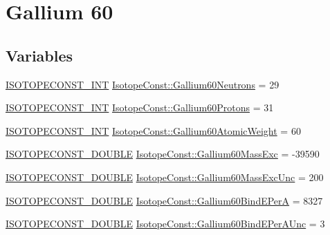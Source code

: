 \hypertarget{group___isotope_const-_gallium-_ga60}{}\section{Gallium 60}
\label{group___isotope_const-_gallium-_ga60}
\subsection*{Variables}
\begin{DoxyCompactItemize}
\item 
\mbox{\hyperlink{group___isotope_const-_macros_ga5f18360b3e99483a35c32d789e62621c}{I\+S\+O\+T\+O\+P\+E\+C\+O\+N\+S\+T\+\_\+\+I\+NT}} \mbox{\hyperlink{group___isotope_const-_gallium-_ga60_gab697fd12d36e5c2ad66c51135e3b0254}{Isotope\+Const\+::\+Gallium60\+Neutrons}} = 29
\item 
\mbox{\hyperlink{group___isotope_const-_macros_ga5f18360b3e99483a35c32d789e62621c}{I\+S\+O\+T\+O\+P\+E\+C\+O\+N\+S\+T\+\_\+\+I\+NT}} \mbox{\hyperlink{group___isotope_const-_gallium-_ga60_gab2f1a6f2be70737ded3924f132def1ab}{Isotope\+Const\+::\+Gallium60\+Protons}} = 31
\item 
\mbox{\hyperlink{group___isotope_const-_macros_ga5f18360b3e99483a35c32d789e62621c}{I\+S\+O\+T\+O\+P\+E\+C\+O\+N\+S\+T\+\_\+\+I\+NT}} \mbox{\hyperlink{group___isotope_const-_gallium-_ga60_ga33897cc7594541c17576898c5fff0ec6}{Isotope\+Const\+::\+Gallium60\+Atomic\+Weight}} = 60
\item 
\mbox{\hyperlink{group___isotope_const-_macros_ga8f45a7272ce02c0b4c65c44636ed719a}{I\+S\+O\+T\+O\+P\+E\+C\+O\+N\+S\+T\+\_\+\+D\+O\+U\+B\+LE}} \mbox{\hyperlink{group___isotope_const-_gallium-_ga60_ga65397c230d168b7f569a55579b13918f}{Isotope\+Const\+::\+Gallium60\+Mass\+Exc}} = -\/39590
\item 
\mbox{\hyperlink{group___isotope_const-_macros_ga8f45a7272ce02c0b4c65c44636ed719a}{I\+S\+O\+T\+O\+P\+E\+C\+O\+N\+S\+T\+\_\+\+D\+O\+U\+B\+LE}} \mbox{\hyperlink{group___isotope_const-_gallium-_ga60_gac091d40a8a1d6e8052d14226fb903c2e}{Isotope\+Const\+::\+Gallium60\+Mass\+Exc\+Unc}} = 200
\item 
\mbox{\hyperlink{group___isotope_const-_macros_ga8f45a7272ce02c0b4c65c44636ed719a}{I\+S\+O\+T\+O\+P\+E\+C\+O\+N\+S\+T\+\_\+\+D\+O\+U\+B\+LE}} \mbox{\hyperlink{group___isotope_const-_gallium-_ga60_gaa6f546a0f1fcacd6d6fac4eccce4e3ea}{Isotope\+Const\+::\+Gallium60\+Bind\+E\+PerA}} = 8327
\item 
\mbox{\hyperlink{group___isotope_const-_macros_ga8f45a7272ce02c0b4c65c44636ed719a}{I\+S\+O\+T\+O\+P\+E\+C\+O\+N\+S\+T\+\_\+\+D\+O\+U\+B\+LE}} \mbox{\hyperlink{group___isotope_const-_gallium-_ga60_ga0f3b4d2adeadfbc26764997d15cfe8e9}{Isotope\+Const\+::\+Gallium60\+Bind\+E\+Per\+A\+Unc}} = 3

\end{DoxyCompactItemize}
